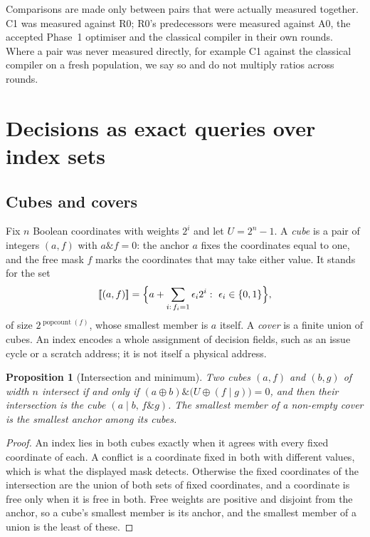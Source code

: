 \documentclass[11pt,a4paper]{article}
\newtheorem{proposition}{Proposition}
\newcommand{\bits}{\{0,1\}}
\newcommand{\den}[1]{[\![#1]\!]}
\begin{document}
Comparisons are made only between pairs that were actually measured together.
C1 was measured against R0; R0's predecessors were measured against A0, the
accepted Phase~1 optimiser and the classical compiler in their own rounds. Where a
pair was never measured directly, for example C1 against the classical compiler on
a fresh population, we say so and do not multiply ratios across rounds.

\section{Decisions as exact queries over index sets}\label{sec:index}

\subsection{Cubes and covers}
Fix $n$ Boolean coordinates with weights $2^i$ and let $U=2^n-1$. A \emph{cube}
is a pair of integers $(a,f)$ with $a\mathbin{\&}f=0$: the anchor $a$ fixes the
coordinates equal to one, and the free mask $f$ marks the coordinates that may
take either value. It stands for the set
\begin{equation}\label{eq:cube}
\den{(a,f)}=\Bigl\{a+\sum_{i:\,f_i=1}\epsilon_i2^i:\ \epsilon_i\in\bits\Bigr\},
\end{equation}
of size $2^{\operatorname{popcount}(f)}$, whose smallest member is $a$ itself. A
\emph{cover} is a finite union of cubes. An index encodes a whole assignment of
decision fields, such as an issue cycle or a scratch address; it is not itself a
physical address.

\begin{proposition}[Intersection and minimum]\label{prop:algebra}
Two cubes $(a,f)$ and $(b,g)$ of width $n$ intersect if and only if
$(a\oplus b)\mathbin{\&}\bigl(U\oplus(f\mathbin{|}g)\bigr)=0$, and then their
intersection is the cube $(a\mathbin{|}b,\,f\mathbin{\&}g)$. The smallest member
of a non-empty cover is the smallest anchor among its cubes.
\end{proposition}
\begin{proof}
An index lies in both cubes exactly when it agrees with every fixed coordinate of
each. A conflict is a coordinate fixed in both with different values, which is
what the displayed mask detects. Otherwise the fixed coordinates of the
intersection are the union of both sets of fixed coordinates, and a coordinate is
free only when it is free in both. Free weights are positive and disjoint from the
anchor, so a cube's smallest member is its anchor, and the smallest member of a
union is the least of these.
\end{proof}
\end{document}
